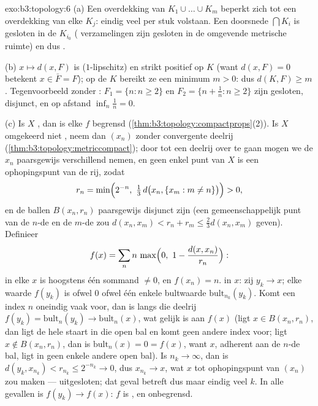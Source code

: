 \begin{solution}{exo:b3:topology:6}
(a) Een overdekking van $K_1 \cup \dots \cup K_m$ beperkt zich tot
een overdekking van elke $K_j$: eindig veel  per
stuk volstaan. Een doorsnede $\bigcap K_i$ is gesloten in de
 $K_{i_0}$ ( verzamelingen zijn gesloten in de
omgevende metrische ruimte) en dus .

(b) $x \mapsto d(x, F)$ is  ($1$-lipschitz) en strikt
positief op $K$ (want $d(x, F) = 0$ betekent $x \in \bar F = F$);
op de  $K$ bereikt ze een minimum $m > 0$: dus $d(K, F)
\geq m$. Tegenvoorbeeld zonder : $F_1 = \{n : n \geq
2\}$ en $F_2 = \{n + \frac1n : n \geq 2\}$ zijn gesloten,
disjunct, en op afstand $\inf_n \frac1n = 0$.

(c) Is $X$ , dan is elke  $f$ begrensd
(\cref{thm:b3:topology:compactprops}(2)). Is $X$ omgekeerd niet
, neem dan $(x_n)$ zonder convergente deelrij
(\cref{thm:b3:topology:metriccompact}); door tot een deelrij over
te gaan mogen we de $x_n$ paarsgewijs verschillend nemen, en geen
enkel punt van $X$ is een ophopingspunt van de rij, zodat
\[
r_n = \min\Bigl(2^{-n},\ \tfrac13\,d\bigl(x_n, \{x_m : m \neq
n\}\bigr)\Bigr) > 0,
\]
en de ballen $B(x_n, r_n)$ paarsgewijs disjunct zijn (een
gemeenschappelijk punt van de $n$-de en de $m$-de zou $d(x_n, x_m)
< r_n + r_m \leq \frac23 d(x_n, x_m)$ geven). Definieer
\[
f(x) = \sum_{n} n\,\max\Bigl(0,\ 1 - \frac{d(x,
x_n)}{r_n}\Bigr):
\]
in elke $x$ is hoogstens één sommand $\neq 0$, en $f(x_n) = n$.
 in $x$: zij $y_k \to x$; elke waarde $f(y_k)$ is
ofwel $0$ ofwel één enkele bultwaarde $\mathrm{bult}_{n_k}(y_k)$.
Komt een index $n$ oneindig vaak voor, dan is langs die deelrij
$f(y_k) = \mathrm{bult}_n(y_k) \to \mathrm{bult}_n(x)$, wat gelijk
is aan $f(x)$ (ligt $x \in B(x_n, r_n)$, dan ligt de hele staart
in die open bal en komt geen andere index voor; ligt $x \notin
B(x_n, r_n)$, dan is $\mathrm{bult}_n(x) = 0 = f(x)$, want $x$,
adherent aan de $n$-de bal, ligt in geen enkele andere open bal).
Is $n_k \to \infty$, dan is $d(y_k, x_{n_k}) < r_{n_k} \leq
2^{-n_k} \to 0$, dus $x_{n_k} \to x$, wat $x$ tot ophopingspunt
van $(x_n)$ zou maken --- uitgesloten; dat geval betreft dus maar
eindig veel $k$. In alle gevallen is $f(y_k) \to f(x)$: $f$ is
, en onbegrensd.
\end{solution}

